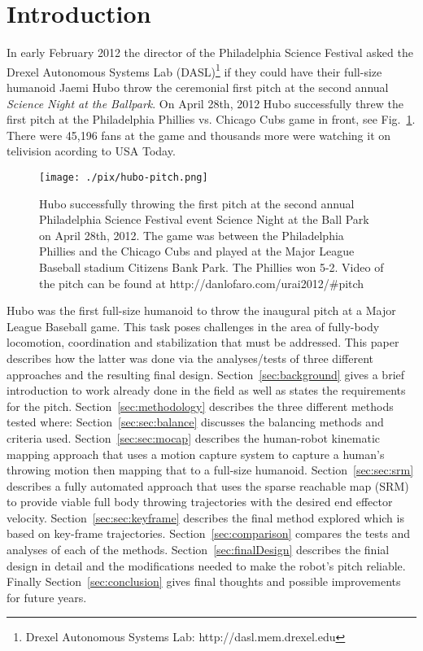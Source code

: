 \section{Introduction}
In early February 2012 the director of the Philadelphia Science Festival asked the Drexel Autonomous Systems Lab (DASL)\footnote{Drexel Autonomous Systems Lab: http://dasl.mem.drexel.edu}\label{foot:dasl} if they could have their full-size humanoid Jaemi Hubo throw the ceremonial first pitch at the second annual \textit{Science Night at the Ballpark}.  
On April 28th, 2012 Hubo successfully threw the first pitch at the Philadelphia Phillies vs. Chicago Cubs game in front, see Fig.~\ref{fig:hubo-throw}.
There were 45,196 fans at the game and thousands more were watching it on telivision acording to USA Today.

\begin{figure}[t]
  \centering
\texttt{[image: ./pix/hubo-pitch.png]}
  \caption{Hubo successfully throwing the first pitch at the second annual Philadelphia Science Festival event Science Night at the Ball Park on April 28th, 2012.  The game was between the Philadelphia Phillies and the Chicago Cubs and played at the Major League Baseball stadium Citizens Bank Park.  The Phillies won 5-2.  Video of the pitch can be found at http://danlofaro.com/urai2012/\#pitch}
  \label{fig:hubo-throw}
\end{figure}



Hubo was the first full-size humanoid to throw the inaugural pitch at a Major League Baseball game.  
This task poses challenges in the area of fully-body locomotion, coordination and stabilization that must be addressed.
This paper describes how the latter was done via the analyses/tests of three different approaches and the resulting final design.
Section~\ref{sec:background} gives a brief introduction to work already done in the field as well as states the requirements for the pitch.
Section~\ref{sec:methodology} describes the three different methods tested where:
Section~\ref{sec:sec:balance} discusses the balancing methods and criteria used.
Section~\ref{sec:sec:mocap} describes the human-robot kinematic mapping approach that uses a motion capture system to capture a human's throwing motion then mapping that to a full-size humanoid.  
Section~\ref{sec:sec:srm} describes a fully automated approach that uses the sparse reachable map (SRM) to provide viable full body throwing trajectories with the desired end effector velocity\cite{dlofaro-srm}.
Section~\ref{sec:sec:keyframe} describes the final method explored which is based on key-frame trajectories.
Section~\ref{sec:comparison} compares the tests and analyses of each of the methods.
Section~\ref{sec:finalDesign} describes the finial design in detail and the modifications needed to make the robot's pitch reliable.
Finally Section~\ref{sec:conclusion} gives final thoughts and possible improvements for future years.


